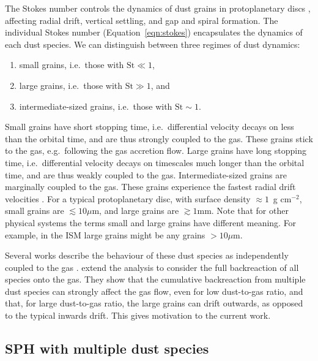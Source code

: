 \documentclass[fleqn,usenatbib]{mnras}
\begin{document}
The Stokes number controls the dynamics of dust grains in protoplanetary discs
\citep{Weidenschilling1977MNRAS.180...57W,Takeuchi2002ApJ...581.1344T},
affecting radial drift, vertical settling, and gap and spiral formation. The
individual Stokes number (Equation~\ref{eqn:stokes}) encapsulates the dynamics
of each dust species. We can distinguish between three regimes of dust dynamics:
%
\begin{enumerate}
   \item small grains, i.e.\ those with \(\mathrm{St} \ll 1\),
   \item large grains, i.e.\ those with \(\mathrm{St} \gg 1\), and
   \item intermediate-sized grains, i.e.\ those with \(\mathrm{St} \sim 1\).
\end{enumerate}
%
Small grains have short stopping time, i.e.\ differential velocity decays on
less than the orbital time, and are thus strongly coupled to the gas. These
grains stick to the gas, e.g.\ following the gas accretion flow. Large grains
have long stopping time, i.e.\ differential velocity decays on timescales much
longer than the orbital time, and are thus weakly coupled to the gas.
Intermediate-sized grains are marginally coupled to the gas. These grains
experience the fastest radial drift velocities
\citep{Takeuchi2002ApJ...581.1344T,Ayliffe2012MNRAS.423.1450A}. For a typical
protoplanetary disc, with surface density \(\approx 1\)~g cm\({}^{-2}\),
small grains are \(\lesssim 10 \mu\mathrm{m}\), and large grains are \(\gtrsim 1
\mathrm{mm}\). Note that for other physical systems the terms small and large
grains have different meaning. For example, in the ISM large grains might be any
grains \(> 10 \mu\mathrm{m}\).

Several works describe the behaviour of these dust species as independently
coupled to the gas
\citep{Nakagawa1986Icar...67..375N,Dipierro2017MNRAS.469.1932D,Kanagawa2017ApJ...844..142K}.
\citet{Dipierro2018MNRAS.479.4187D} extend the analysis to consider the full
backreaction of all species onto the gas. They show that the cumulative
backreaction from multiple dust species can strongly affect the gas flow, even
for low dust-to-gas ratio, and that, for large dust-to-gas ratio, the large
grains can drift outwards, as opposed to the typical inwards drift. This gives
motivation to the current work.


\subsection{SPH with multiple dust species}%
\label{subsec:sph}
\end{document}

